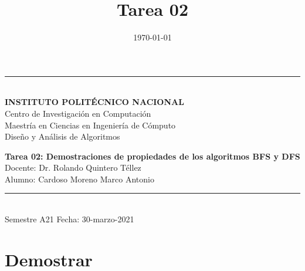 \documentclass[letterpaper, 12pt]{article}
\date{\today}
\title{Tarea 02}
\newcommand{\tarea}{Tarea 02: Demostraciones de propiedades de
los algoritmos BFS y DFS}
\newcommand{\fecha}{30-marzo-2021}
\begin{document}
\begin{titlepage}
\begin{center}
        \vspace*{2mm}
        \rule{\textwidth}{1.5pt}\\
        \vspace*{5mm}
        \textbf{\Large INSTITUTO POLITÉCNICO NACIONAL}\\
        \vspace*{8mm}
        {\Large Centro de Investigación en Computación}\\
        \vspace{8mm}
        {\Large Maestría en Ciencias en Ingeniería de Cómputo}\\
        \vspace{19mm}
        {\Large Diseño y Análisis de Algoritmos}\\
        \vspace{49mm}




        \textbf{\large \tarea}\\





        \vspace*{48mm}
        {\large Docente: Dr. Rolando Quintero Téllez}\\
        \vspace*{20mm}
        {\large Alumno: Cardoso Moreno Marco Antonio}\\
        \vspace*{10mm}
        \rule{\textwidth}{1.5pt}\\
        {\large Semestre A21} \hfill {\large Fecha: \fecha}
    \end{center}
\end{titlepage}

\section{Demostrar}
\label{sec:orgdec23af}
\end{document}
